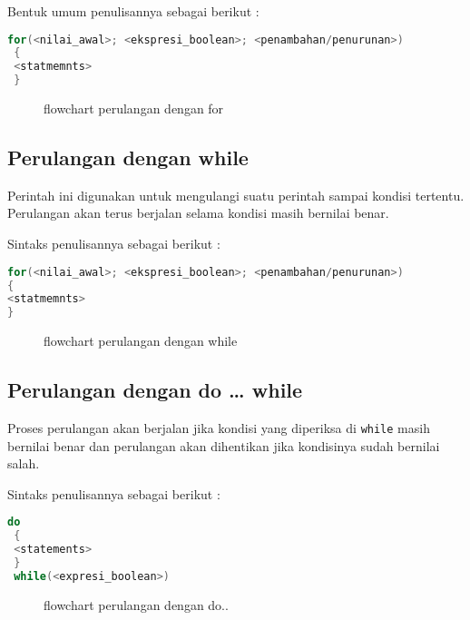 Bentuk umum penulisannya sebagai berikut :

\begin{lstlisting}[language=c++, numbers=none]
 for(<nilai_awal>; <ekspresi_boolean>; <penambahan/penurunan>)
 {
 <statmemnts>
 }
\end{lstlisting}

\begin{figure}[htbp]
\centering
{}
\caption{flowchart perulangan dengan for}
\end{figure}

\subsection{Perulangan dengan while}\label{perulangan-dengan-while}

Perintah ini digunakan untuk mengulangi suatu perintah sampai kondisi
tertentu. Perulangan akan terus berjalan selama kondisi masih bernilai
benar.

Sintaks penulisannya sebagai berikut :

\begin{lstlisting}[language=c++, numbers=none]
for(<nilai_awal>; <ekspresi_boolean>; <penambahan/penurunan>)
{
<statmemnts>
}
\end{lstlisting}

\begin{figure}[htbp]
\centering
{}
\caption{flowchart perulangan dengan while}
\end{figure}

\subsection{Perulangan dengan do \ldots{} while}\label{perulangan-dengan-do-while}

Proses perulangan akan berjalan jika kondisi yang diperiksa di
\texttt{while} masih bernilai benar dan perulangan akan dihentikan jika
kondisinya sudah bernilai salah.

Sintaks penulisannya sebagai berikut :

\begin{lstlisting}[language=c++, numbers=none]
 do
 {
 <statements>
 }
 while(<expresi_boolean>)
\end{lstlisting}

\begin{figure}[htbp]
\centering
{}
\caption{flowchart perulangan dengan do..}
\end{figure}

